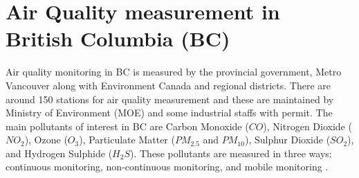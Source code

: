  \section{Air Quality measurement in British Columbia (BC)}

 Air quality monitoring in BC is measured by the provincial government, Metro Vancouver along with Environment Canada and regional districts. There are around 150 stations for air quality measurement and these are maintained by Ministry of Environment (MOE) and some industrial staffs with permit. The main pollutants of interest in BC are Carbon Monoxide ($CO$), Nitrogen Dioxide ($NO_{2}$), Ozone ($O_{3}$), Particulate Matter ($PM_{2.5}$ and $PM_{10}$), Sulphur Dioxide ($SO_{2}$), and Hydrogen Sulphide ($H_{2}S$). These pollutants are measured in three ways: continuous monitoring, non-continuous monitoring, and mobile monitoring \cite{bc}.
 
